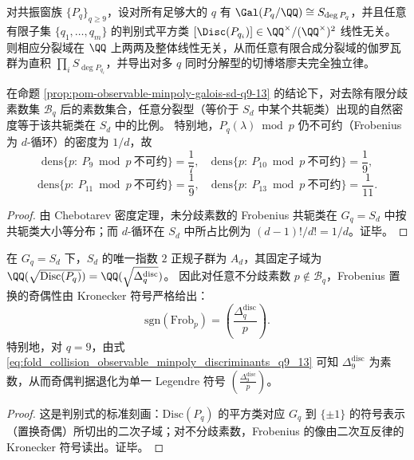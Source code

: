 \begin{conjecture}[共振窗分裂域的判别式平方类无限独立性]\label{conj:pom-resonance-disc-squareclass-infinite-independence}
对共振窗族 \(\{P_q\}_{q\ge 9}\)，设对所有足够大的 \(q\) 有 \(\Gal(P_q/\QQ)\cong S_{\deg P_q}\)，并且任意有限子集 \(\{q_1,\dots,q_m\}\) 的判别式平方类
\(
[\Disc(P_{q_i})]\in \QQ^\times/(\QQ^\times)^2
\)
线性无关。
则相应分裂域在 \(\QQ\) 上两两及整体线性无关，从而任意有限合成分裂域的伽罗瓦群为直积 \(\prod_i S_{\deg P_{q_i}}\)，并导出对多 \(q\) 同时分解型的切博塔廖夫完全独立律。
\end{conjecture}

\begin{corollary}\label{cor:pom-observable-minpoly-chebotarev-density-q9-13}
在命题 \ref{prop:pom-observable-minpoly-galois-sd-q9-13} 的结论下，对去除有限分歧素数集 \(\mathcal{B}_q\) 后的素数集合，任意分裂型（等价于 \(S_d\) 中某个共轭类）出现的自然密度等于该共轭类在 \(S_d\) 中的比例。
特别地，\(P_q(\lambda)\bmod p\) 仍不可约（Frobenius 为 \(d\)-循环）的密度为 \(1/d\)，故
\[
\mathrm{dens}\{p:\ P_9\bmod p\ \text{不可约}\}=\frac17,\quad
\mathrm{dens}\{p:\ P_{10}\bmod p\ \text{不可约}\}=\frac19,
\]
\[
\mathrm{dens}\{p:\ P_{11}\bmod p\ \text{不可约}\}=\frac19,\quad
\mathrm{dens}\{p:\ P_{13}\bmod p\ \text{不可约}\}=\frac1{11}.
\]
\end{corollary}
\begin{proof}
由 Chebotarev 密度定理，未分歧素数的 Frobenius 共轭类在 \(G_q=S_d\) 中按共轭类大小等分布；而 \(d\)-循环在 \(S_d\) 中所占比例为 \((d-1)!/d!=1/d\)。证毕。
\end{proof}

\begin{corollary}\label{cor:pom-observable-minpoly-frob-parity-q9-13}
在 \(G_q=S_d\) 下，\(S_d\) 的唯一指数 \(2\) 正规子群为 \(A_d\)，其固定子域为 \(\QQ(\sqrt{\mathrm{Disc}(P_q)})=\QQ(\sqrt{\Delta_q^{\mathrm{disc}}})\)。
因此对任意不分歧素数 \(p\notin\mathcal{B}_q\)，Frobenius 置换的奇偶性由 Kronecker 符号严格给出：
\[
\mathrm{sgn}(\mathrm{Frob}_p)=\left(\frac{\Delta_q^{\mathrm{disc}}}{p}\right).
\]
特别地，对 \(q=9\)，由式 \eqref{eq:fold_collision_observable_minpoly_discriminants_q9_13} 可知 \(\Delta_9^{\mathrm{disc}}\) 为素数，从而奇偶判据退化为单一 Legendre 符号 \(\left(\frac{\Delta_9^{\mathrm{disc}}}{p}\right)\)。
\end{corollary}
\begin{proof}
这是判别式的标准刻画：\(\mathrm{Disc}(P_q)\) 的平方类对应 \(G_q\) 到 \(\{\pm 1\}\) 的符号表示（置换奇偶）所切出的二次子域；对不分歧素数，Frobenius 的像由二次互反律的 Kronecker 符号读出。证毕。
\end{proof}

